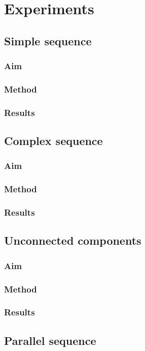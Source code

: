 \chapter{Experiments}
\label{chap:experiments}

\section{Simple sequence}
\subsection{Aim}
\subsection{Method}
\subsection{Results}

\section{Complex sequence}
\subsection{Aim}
\subsection{Method}
\subsection{Results}

\section{Unconnected components}
\subsection{Aim}
\subsection{Method}
\subsection{Results}

\section{Parallel sequence}
